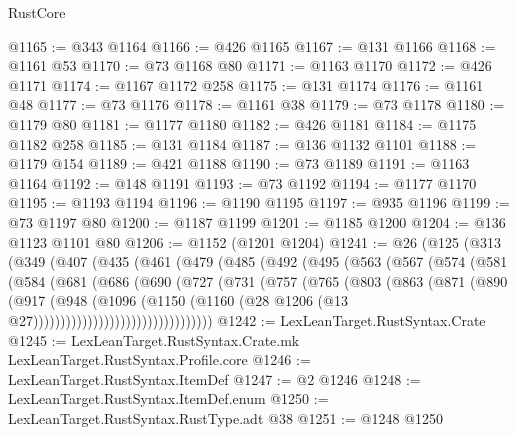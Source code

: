 \begin{lexlean}{RustCore}
\begin{coremodule}
@1165 := @343 @1164
@1166 := @426 @1165
@1167 := @131 @1166
@1168 := @1161 @53
@1170 := @73 @1168 @80
@1171 := @1163 @1170
@1172 := @426 @1171
@1174 := @1167 @1172 @258
@1175 := @131 @1174
@1176 := @1161 @48
@1177 := @73 @1176
@1178 := @1161 @38
@1179 := @73 @1178
@1180 := @1179 @80
@1181 := @1177 @1180
@1182 := @426 @1181
@1184 := @1175 @1182 @258
@1185 := @131 @1184
@1187 := @136 @1132 @1101
@1188 := @1179 @154
@1189 := @421 @1188
@1190 := @73 @1189
@1191 := @1163 @1164
@1192 := @148 @1191
@1193 := @73 @1192
@1194 := @1177 @1170
@1195 := @1193 @1194
@1196 := @1190 @1195
@1197 := @935 @1196
@1199 := @73 @1197 @80
@1200 := @1187 @1199
@1201 := @1185 @1200
@1204 := @136 @1123 @1101 @80
@1206 := @1152 (@1201 @1204)
@1241 := @26
    (@125
      (@313
        (@349
          (@407
            (@435
              (@461
                (@479
                  (@485
                    (@492
                      (@495
                        (@563
                          (@567
                            (@574
                              (@581
                                (@584
                                  (@681
                                    (@686
                                      (@690
                                        (@727
                                          (@731
                                            (@757
                                              (@765
                                                (@803
                                                  (@863
                                                    (@871
                                                      (@890
                                                        (@917
                                                          (@948
                                                            (@1096
                                                              (@1150
                                                                (@1160
                                                                  (@28
                                                                    @1206
                                                                    (@13
                                                                      @27)))))))))))))))))))))))))))))))))
@1242 := LexLeanTarget.RustSyntax.Crate
@1245 := LexLeanTarget.RustSyntax.Crate.mk LexLeanTarget.RustSyntax.Profile.core
@1246 := LexLeanTarget.RustSyntax.ItemDef
@1247 := @2 @1246
@1248 := LexLeanTarget.RustSyntax.ItemDef.enum
@1250 := LexLeanTarget.RustSyntax.RustType.adt @38
@1251 := @1248 @1250

\end{coremodule}
\end{lexlean}
